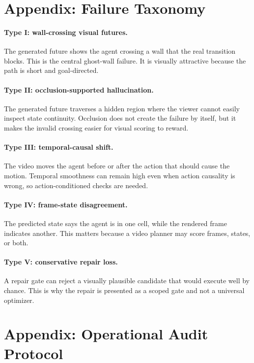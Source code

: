 \documentclass{article}
\begin{document}
\section{Appendix: Failure Taxonomy}

\paragraph{Type I: wall-crossing visual futures.}
The generated future shows the agent crossing a wall that the real transition blocks. This is the central ghost-wall failure. It is visually attractive because the path is short and goal-directed.

\paragraph{Type II: occlusion-supported hallucination.}
The generated future traverses a hidden region where the viewer cannot easily inspect state continuity. Occlusion does not create the failure by itself, but it makes the invalid crossing easier for visual scoring to reward.

\paragraph{Type III: temporal-causal shift.}
The video moves the agent before or after the action that should cause the motion. Temporal smoothness can remain high even when action causality is wrong, so action-conditioned checks are needed.

\paragraph{Type IV: frame-state disagreement.}
The predicted state says the agent is in one cell, while the rendered frame indicates another. This matters because a video planner may score frames, states, or both.

\paragraph{Type V: conservative repair loss.}
A repair gate can reject a visually plausible candidate that would execute well by chance. This is why the repair is presented as a scoped gate and not a universal optimizer.

\section{Appendix: Operational Audit Protocol}
\end{document}
